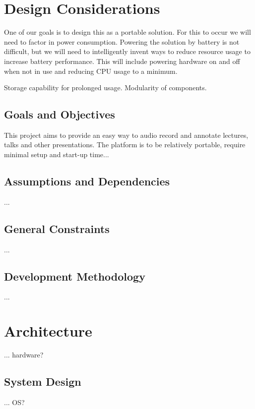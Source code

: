 \documentclass[11pt,a4paper,titlepage]{report}
\begin{document}
\section{Design Considerations}

One of our goals is to design this as a portable solution. For this to occur we will need to factor in power consumption. Powering the solution by battery is not difficult, but we will need to intelligently invent ways to reduce resource usage to increase battery performance. This will include powering hardware on and off when not in use and reducing CPU usage to a minimum. 

Storage capability for prolonged usage. Modularity of components.


\subsection{Goals and Objectives}

This project aims to provide an easy way to audio record and annotate lectures, talks and other presentations. The platform is to be relatively portable, require minimal setup and start-up time...

\subsection{Assumptions and Dependencies}

...

\subsection{General Constraints}

...

\subsection{Development Methodology}

...

\section{Architecture}

... hardware?

\subsection{System Design}

... OS?
\end{document}
